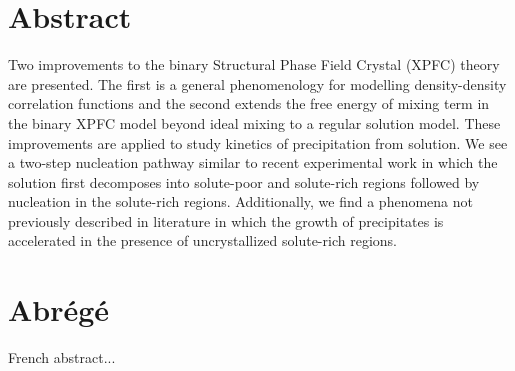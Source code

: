 \section*{Abstract}
\label{sec:abstract}

Two improvements to the binary Structural Phase Field Crystal (XPFC) theory are
presented. The first is a general phenomenology for modelling density-density
correlation functions and the second extends the free energy of mixing term in
the binary XPFC model beyond ideal mixing to a regular solution model. These
improvements are applied to study kinetics of precipitation from solution. We
see a two-step nucleation pathway similar to recent experimental work
\cite{LOH17, WALLACE13} in which the solution first decomposes into solute-poor
and solute-rich regions followed by nucleation in the solute-rich regions.
Additionally, we find a phenomena not previously described in literature in
which the growth of precipitates is accelerated in the presence of
uncrystallized solute-rich regions.

\clearpage

\section*{Abrégé}
\label{sec:abrege}

French abstract...


